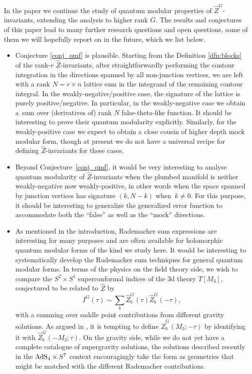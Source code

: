\documentclass[10pt,a4paper]{amsart}
\theoremstyle{definition}
\numberwithin{equation}{section}
\begin{document}
In the paper we continue the study of quantum modular properties of $\widehat Z^G$-invariants, extending the analysis to higher rank $G$. The results and conjectures of this paper lead to many further research questions and open questions, some of them we will hopefully report on in the future, which we list below.
\begin{itemize}\itemsep=0pt
 \item Conjecture \ref{conj_qmf} is plausible. Starting from the Definition \ref{dfn:blocks} of the rank-$r$ $\widehat Z$-invariants, after straightforwardly performing the contour integration in the directions spanned by all non-junction vertices, we are left with a rank $N=r\times n$ lattice sum in the integrand of the remaining contour integral. In the weakly-negative/positive case, the signature of the lattice is purely positive/negative. In particular, in the weakly-negative case we obtain a~sum over (derivatives of) rank $N$ false-theta-like function. It should be interesting to prove their quantum modularity explicitly. Similarly, for the weakly-positive case we expect to obtain a close cousin of higher depth mock modular form, though at present we do not have a universal recipe for defining $\widehat Z$-invariants for these cases.
 \item Beyond Conjecture~\ref{conj_qmf}, it would be very interesting to analyse quantum modularity of $\widehat Z$-invariants when the plumbed manifold is neither weakly-negative now weakly-positive, in other words when the space spanned by junction vertices has signature $(k,N-k)$ when~$k\neq 0$. For this purpose, it should be interesting to generalize the generalized error function \cite{Alexandrov:2016enp, Bringmann:2021dxg} to accommodate both the ``false'' as well as the ``mock'' directions.
 \item As mentioned in the introduction, Rademacher sum expressions are interesting for many purposes and are often available for holomorphic quantum modular forms of the kind we study here. It would be interesting to systematically develop the Rademacher sum techniques for general quantum modular forms. In terms of the physics on the field theory side, we wish to compare the $S^2\times S^1$ superconformal indices of the 3d theory $T[M_3]$, conjectured to be related to $\widehat Z$ by
 \[
 I^G(\tau)\sim \sum_b \widehat Z^G_b(\tau) \widehat Z^G_b(-\tau),
 \]
 with a summing over saddle point contributions from different gravity solutions. As argued in \cite{cheng20193d}, it is tempting to define $\widehat Z^G_b(M_3;-\tau)$ by identifying it with $\widehat Z^G_b(-M_3;\tau)$. On the gravity side, while we do not yet have a complete catalogue of supergravity solutions, the solutions described recently \cite{BenettiGenolini:2023rkq} in the ${\rm AdS}_4\times S^7$ context encouragingly take the form as geometries that might be matched with the different Rademacher contributions.

\end{itemize}
\end{document}
